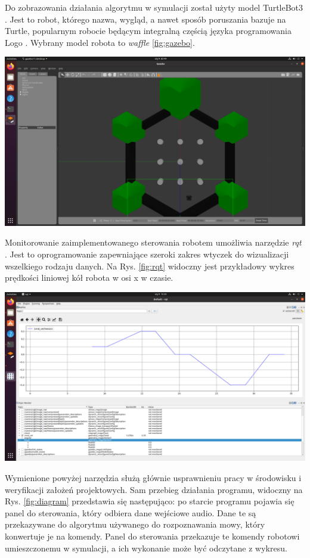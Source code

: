 Do zobrazowania działania algorytmu w symulacji został użyty model TurtleBot3 \cite{turtlebot}. Jest to robot, którego nazwa, wygląd, a nawet sposób poruszania bazuje na Turtle, popularnym robocie będącym integralną częścią języka programowania Logo \cite{logo}. Wybrany model robota to \textit{waffle} \ref{fig:gazebo}.

\begin{center}
    \includegraphics[width=0.8\linewidth]{files/gazebo.png}
    \label{fig:gazebo}
\end{center}

Monitorowanie zaimplementowanego sterowania robotem umożliwia narzędzie \textit{rqt} \cite{rqt}. Jest to oprogramowanie zapewniające szeroki zakres wtyczek do wizualizacji wszelkiego rodzaju danych. Na Rys. \ref{fig:rqt} widoczny jest przykładowy wykres prędkości liniowej kół robota w osi x w czasie. 

\begin{center}
    \includegraphics[width=0.8\linewidth]{files/rqt_view.png}
    \label{fig:rqt}
\end{center}

Wymienione powyżej narzędzia służą głównie usprawnieniu pracy w środowisku i weryfikacji założeń projektowych. Sam przebieg działania programu, widoczny na Rys. \ref{fig:diagram} przedstawia się następująco: po starcie programu pojawia się panel do sterowania, który odbiera dane wejściowe audio. Dane te są przekazywane do algorytmu używanego do rozpoznawania mowy, który konwertuje je na komendy. Panel do sterowania przekazuje te komendy robotowi umieszczonemu w symulacji, a ich wykonanie może być odczytane z wykresu.

